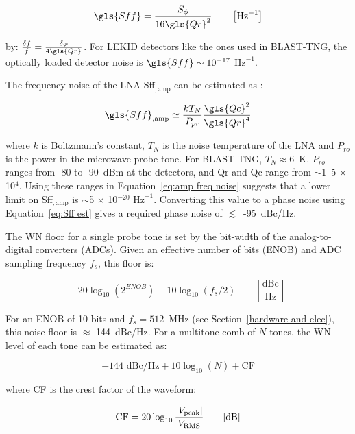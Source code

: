 \begin{equation}\label{eq:Sff est}
  \gls{Sff} = \frac{S_{\phi}}{16 \gls{Qr}^{2}} \qquad \left[ \mathrm{Hz}^{-1} \right]
\end{equation}

by: $\frac{\delta f}{f} = \frac{\delta \phi}{4 \gls{Qr}}$. For LEKID detectors like the ones used in BLAST-TNG, the optically loaded detector noise is $\gls{Sff} \sim 10^{-17}$ $\mathrm{Hz}^{-1}$.

The frequency noise of the LNA \gls{Sff}$_{,\mathrm{amp}}$ can be estimated as \citep{barry2014development}:

\begin{equation}\label{eq:amp freq noise}
  \gls{Sff}_{,\mathrm{amp}} \simeq \frac{kT_{N}}{P_{pr}}\frac{\gls{Qc}^{2}}{\gls{Qr}^{4}}
\end{equation}

where $k$ is Boltzmann's constant, $T_{N}$ is the noise temperature of the LNA and $P_{ro}$ is the power in the microwave probe tone. For BLAST-TNG, $T_{N} \approx 6$~K. $P_{ro}$ ranges from -80 to -90~dBm at the detectors, and \gls{Qr} and \gls{Qc} range from $\sim$1--5 $\times$ 10$^{4}$. Using these ranges in Equation~\ref{eq:amp freq noise} suggests that a lower limit on \gls{Sff}$_{,\mathrm{amp}}$ is $\sim$5 $\times$ 10$^{-20}$ $\mathrm{Hz}^{-1}$. Converting this value to a phase noise using Equation~\ref{eq:Sff est} gives a required phase noise of $\lesssim$~-95~dBc/Hz.

The WN floor for a single probe tone is set by the bit-width of the analog-to-digital converters (ADCs). Given an effective number of bits (ENOB) and ADC sampling frequency $f_{s}$, this floor is:

\begin{equation}
-20\log_{10}(2^{ENOB})- 10\log_{10}(f_{s}/2) \qquad \left[ \frac{\mathrm{dBc}}{\mathrm{Hz}} \right]
\end{equation}

For an ENOB of 10-bits and $f_{s} = 512$~MHz (see Section~\ref{hardware and elec}), this noise floor is $\approx$-144~dBc/Hz. For a multitone comb of $N$ tones, the WN level of each tone can be estimated as:

\begin{equation}\label{eq:whitenoise}
-144 \textrm{ dBc/Hz} + 10\log_{10}(N) + \mathrm{CF}
\end{equation}

where CF is the crest factor of the waveform:

\begin{equation}
  \mathrm{CF} = 20\log_{10}{|V_{\mathrm{peak} }| \over V_{\mathrm {\mathrm{RMS}} }} \qquad [\mathrm{dB}]
\end{equation}

